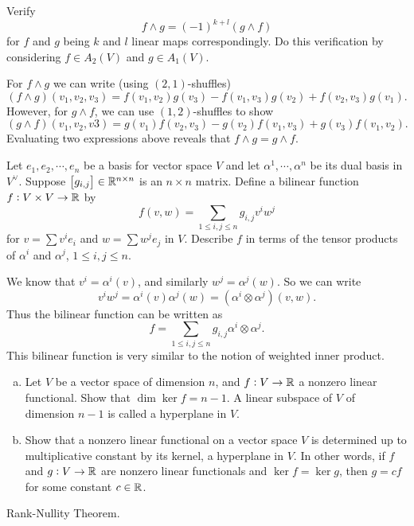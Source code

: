 \begin{problem}
	Verify 
	\[ f \wedge g = (-1)^{k+l}(g\wedge f) \]
	for $ f $ and $ g $ being $ k $ and $ l $ linear maps correspondingly. Do this verification by considering $ f\in A_2(V) $ and $ g \in A_1(V) $.
\end{problem}

\begin{solution}
	For $ f\wedge g $ we can write (using $ (2,1) $-shuffles)
	\[(f\wedge g)(v_1,v_2,v_3) = f(v_1,v_2)g(v_3) - f(v_1,v_3)g(v_2) + f(v_2,v_3)g(v_1).\]
	However, for $ g\wedge f $, we can use $ (1,2) $-shuffles to show
	\[ (g\wedge f)(v_1,v_2,v3) = g(v_1)f(v_2,v_3) - g(v_2)f(v_1,v_3) + g(v_3)f(v_1,v_2).  \]
	Evaluating two expressions above reveals that $ f\wedge g = g \wedge f. $
\end{solution}

\begin{problem}
	Let $ e_1,e_2,\cdots,e_n $ be a basis for vector space $ V $ and let $ \alpha^1,\cdots,\alpha^n $ be its dual basis in $ V^\vee $. Suppose $ \left[g_{i,j}\right] \in \mathbb{R}^{n\times n} $ is an $ n\times n $ matrix. Define a bilinear function $ f: V\times V \to \mathbb{R} $ by
	\[ f(v,w) = \sum_{1 \leq i,j \leq n} g_{i,j}v^i w^j \]
	for $ v = \sum v^i e_i $ and $ w = \sum w^j e_j $ in $ V $. Describe $ f $ in terms of the tensor products of $ \alpha^i $ and $ \alpha^j $, $ 1 \leq i, j \leq n $.
\end{problem}
\begin{solution}
	We know that $ v^i = \alpha^i (v) $, and similarly $ w^j = \alpha^j (w) $. So we can write
	\[ v^i w^j = \alpha^i(v) \alpha^j (w) = (\alpha^i \otimes \alpha^j)(v,w). \]
	Thus the bilinear function can be written as
	\[ f = \sum_{1\leq i,j \leq n} g_{i,j} \alpha^i \otimes \alpha^j. \]
	This bilinear function is very similar to the notion of weighted inner product.
\end{solution}

\begin{problem}
	\begin{enumerate}[(a)]
		\item Let $ V $ be a vector space of dimension $ n $, and $ f:V \to \mathbb{R}$ a nonzero linear functional. Show that $ \dim \ker f  = n-1 $. A linear subspace of $ V $ of dimension $ n-1 $ is called a hyperplane in $ V $.
		\item Show that a nonzero linear functional on a vector space $ V $ is determined up to multiplicative constant by its kernel, a hyperplane in $ V $. In other words, if $ f $ and $ g : V \to \mathbb{R} $ are nonzero linear functionals and $ \ker f = \ker g $, then $ g = cf $ for some constant $ c \in \mathbb{R} $.
	\end{enumerate}
	
\end{problem}

\begin{solution}
	Rank-Nullity Theorem.
\end{solution}
